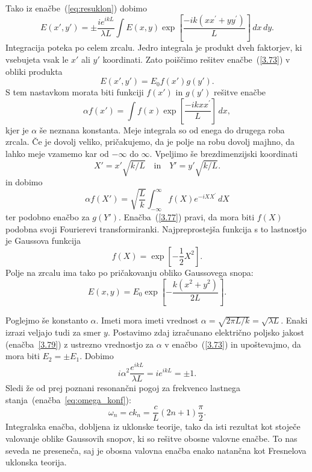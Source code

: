Tako iz enačbe~(\ref{eq:resuklon})
dobimo 
\begin{equation}
E(x',y')=\pm\frac{ie^{ikL}}{\lambda L}\int E(x,y)\exp
\left[\frac{-ik(xx^{\prime}+yy^{\prime})}{L}\right]\, dx\, dy.
\label{3.73}
\end{equation}
Integracija poteka po celem zrcalu. Jedro integrala je produkt dveh
faktorjev, ki vsebujeta vsak le $x'$ ali $y'$ koordinati. Zato poiščimo
rešitev enačbe~(\ref{3.73}) v obliki produkta 
\begin{equation}
E(x',y')=E_{0}f(x')g(y').
\label{3.74}
\end{equation}
S tem nastavkom morata biti funkciji $f(x')$ in $g(y')$ rešitve enačbe
\begin{equation}
\alpha f(x')=\int f(x)\exp\left[\frac{-ikxx^{\prime}}{L}\right]\, dx,
\label{3.75}
\end{equation}
kjer je $\alpha$ še neznana konstanta. Meje integrala so od enega do 
drugega roba zrcala. Če je dovolj veliko,
pričakujemo, da je polje na robu dovolj majhno, da lahko meje vzamemo
kar od $-\infty$ do $\infty$. Vpeljimo še brezdimenzijski koordinati
\begin{equation}
X'=x'\sqrt{k/L} \quad \mathrm{in} \quad Y'=y'\sqrt{k/L}.
\label{3.76}
\end{equation}
in dobimo
\begin{equation}
\alpha f(X')=\sqrt{\frac{L}{k}}\int_{-\infty}^{\infty}f(X)e^{-iXX^{\prime}}\, dX
\label{3.77}
\end{equation}
ter podobno enačbo za $g(Y')$. Enačba~(\ref{3.77}) pravi, da mora
biti $f(X)$ podobna svoji Fourierevi transformiranki. Najpreprostejša
funkcija s to lastnostjo je Gaussova funkcija 
\begin{equation}
f(X)=\exp[-\frac{1}{2}X^{2}].
\label{3.78}
\end{equation}
Polje na zrcalu ima tako po pričakovanju obliko Gaussovega snopa:
\begin{equation}
E(x,y)=E_{0}\exp\left[-\frac{k(x^{2}+y^{2})}{2L}\right].
\label{3.79}
\end{equation}

Poglejmo še konstanto $\alpha$. Imeti mora imeti vrednost 
$\alpha = \sqrt{2\pi L/k}=\sqrt{\lambda L}$.
Enaki izrazi veljajo tudi za smer $y$. Postavimo zdaj izračunano električno 
poljsko jakost (enačba~\ref{3.79}) z ustrezno vrednostjo za $\alpha$ v 
enačbo~(\ref{3.73}) in upoštevajmo, da mora biti
$E_{2}=\pm E_{1}$. Dobimo 
\begin{equation}
i\alpha^{2}\frac{e^{ikL}}{\lambda L}=ie^{ikL}=\pm1.
\label{3.80}
\end{equation}
Sledi že od prej poznani resonančni pogoj za
frekvenco lastnega stanja~(enačba~\ref{eq:omega_konf}):
\begin{equation}
\omega_{n}=ck_{n}=\frac{c}{L}(2n+1)\frac{\pi}{2}.
\label{3.81}
\end{equation}
Integralska enačba, dobljena iz uklonske teorije, tako da
isti rezultat kot stoječe valovanje oblike Gaussovih snopov, ki so
rešitve obosne valovne enačbe. To nas seveda ne preseneča, saj je
obosna valovna enačba enako natančna kot Fresnelova uklonska teorija.

